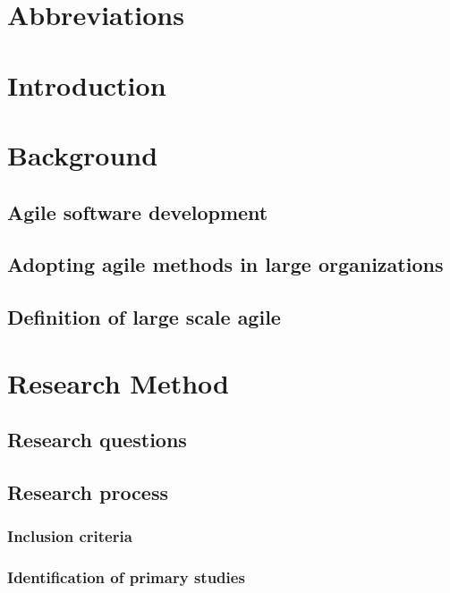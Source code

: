 \documentclass{article}
\author{Ville Kumpulainen}
\begin{document}



\newpage
\tableofcontents
\newpage
\section*{Abbreviations}

\newpage

\section{Introduction}


\section{Background}

\subsection{Agile software development}

\subsection{Adopting agile methods in large organizations}

\subsection{Definition of large scale agile}


\section{Research Method}

\subsection{Research questions}

\subsection{Research process}

\subsubsection{Inclusion criteria}

\subsubsection{Identification of primary studies}

\end{document}
